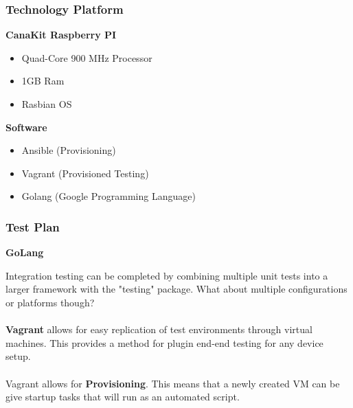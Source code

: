 \begin{frame}
\frametitle{Technology Platform}


\textbf{CanaKit Raspberry PI}
\begin{itemize}
\item Quad-Core 900 MHz Processor
\item 1GB Ram
\item Rasbian OS
\end{itemize}

\textbf{Software}
\begin{itemize}
\item Ansible (Provisioning)
\item Vagrant (Provisioned Testing)
\item Golang (Google Programming Language)
\end{itemize}


\end{frame}

\begin{frame}

\frametitle{Test Plan}
\textbf{GoLang}

Integration testing can be completed by combining multiple unit tests into a larger framework with the "testing" package. 
What about multiple configurations or platforms though?\\~\\

\textbf {Vagrant} allows for easy replication of test environments through virtual machines. This provides a method for plugin end-end testing for any device setup. \\~\\

Vagrant allows for \textbf{Provisioning}. This means that a newly created VM can be give startup tasks that will run as an automated script.

\end{frame}

